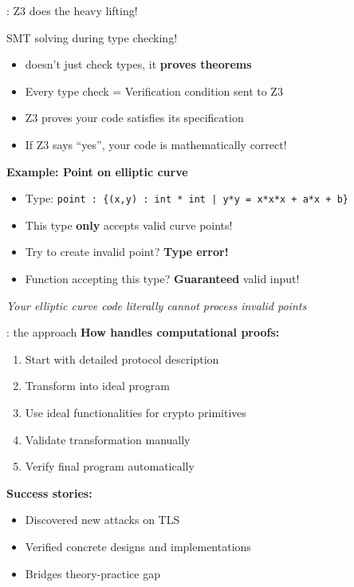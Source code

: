 \documentclass[aspectratio=169, lualatex, handout]{beamer}
\begin{document}
\begin{frame}{\fstar: Z3 does the heavy lifting!}
	\begin{center}
		\Large
		SMT solving during type checking!
	\end{center}
	\vspace{0.5em}
	\begin{itemize}
		\item \fstar doesn't just check types, it \textbf{proves theorems}
		\item Every type check = Verification condition sent to Z3
		\item Z3 proves your code satisfies its specification
		\item If Z3 says ``yes'', your code is mathematically correct!
	\end{itemize}
	\vspace{0.5em}
	\textbf{Example: Point on elliptic curve}
	\begin{itemize}
		\item Type: \texttt{point : \{(x,y) : int * int | y*y = x*x*x + a*x + b\}}
		\item This type \textbf{only} accepts valid curve points!
		\item Try to create invalid point? \textbf{Type error!}
		\item Function accepting this type? \textbf{Guaranteed} valid input!
	\end{itemize}
	\vspace{0.1em}
	\begin{center}
		\textit{Your elliptic curve code literally cannot process invalid points}
	\end{center}
\end{frame}

\begin{frame}{\fstar: the approach}
	\textbf{How \fstar handles computational proofs:}
	\begin{enumerate}
		\item Start with detailed protocol description
		\item Transform into ideal program
		\item Use ideal functionalities for crypto primitives
		\item Validate transformation manually
		\item Verify final program automatically
	\end{enumerate}
	\vspace{0.5em}
	\textbf{Success stories:}
	\begin{itemize}
		\item Discovered new attacks on TLS
		\item Verified concrete designs and implementations
		\item Bridges theory-practice gap
	\end{itemize}
\end{frame}
\end{document}
